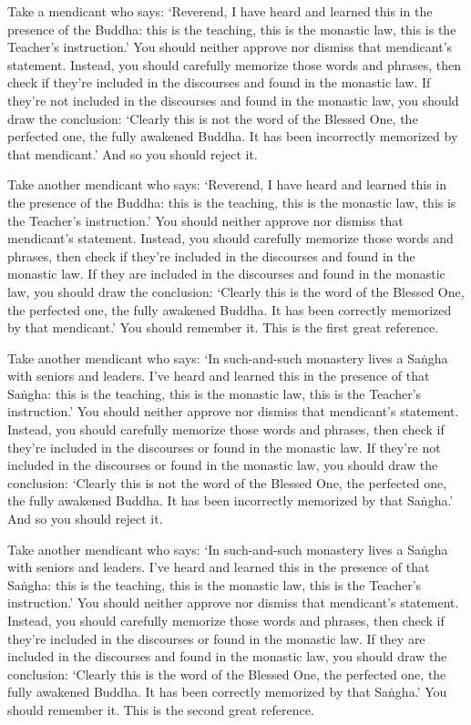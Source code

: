 \documentclass[12pt,openany]{book}%
\begin{document}
Take a mendicant who says: ‘Reverend, I have heard and learned this in the presence of the Buddha: this is the teaching, this is the monastic law, this is the Teacher’s instruction.’ You should neither approve nor dismiss that mendicant’s statement. Instead, you should carefully memorize those words and phrases, then check if they’re included in the discourses and found in the monastic law. If they’re not included in the discourses and found in the monastic law, you should draw the conclusion: ‘Clearly this is not the word of the Blessed One, the perfected one, the fully awakened Buddha. It has been incorrectly memorized by that mendicant.’ And so you should reject it. 

Take another mendicant who says: ‘Reverend, I have heard and learned this in the presence of the Buddha: this is the teaching, this is the monastic law, this is the Teacher’s instruction.’ You should neither approve nor dismiss that mendicant’s statement. Instead, you should carefully memorize those words and phrases, then check if they’re included in the discourses and found in the monastic law. If they are included in the discourses and found in the monastic law, you should draw the conclusion: ‘Clearly this is the word of the Blessed One, the perfected one, the fully awakened Buddha. It has been correctly memorized by that mendicant.’ You should remember it. This is the first great reference. 

Take another mendicant who says: ‘In such-and-such monastery lives a \textsanskrit{Saṅgha} with seniors and leaders. I’ve heard and learned this in the presence of that \textsanskrit{Saṅgha}: this is the teaching, this is the monastic law, this is the Teacher’s instruction.’ You should neither approve nor dismiss that mendicant’s statement. Instead, you should carefully memorize those words and phrases, then check if they’re included in the discourses or found in the monastic law. If they’re not included in the discourses or found in the monastic law, you should draw the conclusion: ‘Clearly this is not the word of the Blessed One, the perfected one, the fully awakened Buddha. It has been incorrectly memorized by that \textsanskrit{Saṅgha}.’ And so you should reject it. 

Take another mendicant who says: ‘In such-and-such monastery lives a \textsanskrit{Saṅgha} with seniors and leaders. I’ve heard and learned this in the presence of that \textsanskrit{Saṅgha}: this is the teaching, this is the monastic law, this is the Teacher’s instruction.’ You should neither approve nor dismiss that mendicant’s statement. Instead, you should carefully memorize those words and phrases, then check if they’re included in the discourses or found in the monastic law. If they are included in the discourses and found in the monastic law, you should draw the conclusion: ‘Clearly this is the word of the Blessed One, the perfected one, the fully awakened Buddha. It has been correctly memorized by that \textsanskrit{Saṅgha}.’ You should remember it. This is the second great reference. 
\end{document}

